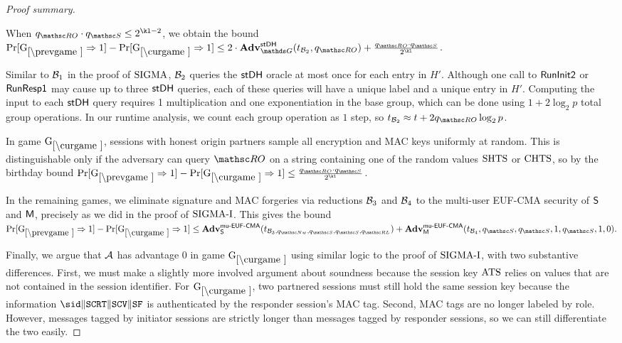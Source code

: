 \begin{proof}[Proof summary]
\begin{enumerate}
\end{enumerate}
When $\qRO \cdot \qSend \leq 2^{\kl - 2}$, we obtain the bound
$\Pr[\prevGm*\Rightarrow 1 ] - \Pr[\curGm*\Rightarrow 1] \leq 2 \cdot \Adv^{\strongDH}_{\group}(t_{\advB_2},\qRO) +\frac{\qRO \cdot \qSend}{2^{\kl}}$.

Similar to $\mathcal{B}_1$ in the proof of $\mbox{SIGMA}$, $\mathcal{B}_2$ queries the $\mathsf{stDH}$ oracle at most once for each entry in $H'$. Although one call to $\mathsf{RunInit2}$ or $\mathsf{RunResp1}$ may cause up to three $\mathsf{stDH}$ queries, each of these queries will have a unique label and a unique entry in $H'$.
Computing the input to each $\mathsf{stDH}$ query requires 1 multiplication and one exponentiation in the base group, which can be done using $1+2\log_2 p$ total group operations. In our runtime analysis, we count each group operation as $1$ step, so $t_{\advB_2} \approx t + 2 \qRO\log_2 p$.

In game $\curGm$, sessions with honest origin partners sample all encryption and MAC keys uniformly at random. This is distinguishable only if the adversary can query $\RO$ on a string containing one of the random values $\mathrm{SHTS}$ or $\mathrm{CHTS}$, so by the birthday bound
$\Pr[\prevGm*\Rightarrow 1 ] - \Pr[\curGm*\Rightarrow 1] \leq \frac{\qRO\cdot \qSend}{2^{\kl}}$.

In the remaining games, we eliminate signature and MAC forgeries via reductions $\mathcal{B}_3$ and $\mathcal{B}_4$ to the multi-user EUF-CMA security of $\mathsf{S}$ and $\mathsf{M}$, precisely as we did in the proof of $\mbox{SIGMA-I}$. This gives the bound 
$
	\Pr[\prevGm*\Rightarrow 1 ] - \Pr[\curGm*\Rightarrow 1] \leq
		\Adv^{\muEUFCMA}_{\SIGScheme}(t_{\advB_3\cab \qNew\cab \qSend\cab \qSend\cab \qRevLongTermKey})
		+ \Adv^{\muEUFCMA}_{\MACScheme}(t_{\advB_4}\cab \qSend\cab \qSend\cab 1\cab \qSend\cab 1\cab 0).
$

Finally, we argue that $\mathcal{A}$ has advantage $0$ in game $\curGm$ using similar logic to the proof of $\mbox{SIGMA-I}$, with two substantive differences. 
First, we must make a slightly more involved argument about soundness because the session key $\mathrm{ATS}$ relies on values that are not contained in the session identifier. 
For $\curGm$, two partnered sessions must still hold the same session key because the information $\sid\conc\sSCERT\conc\sSCERTV\conc\sSFIN$ is authenticated by the responder session's MAC tag. 
Second, MAC tags are no longer labeled by role. However, messages tagged by initiator sessions are strictly longer than messages tagged by responder sessions, so we can still differentiate the two easily. 
\end{proof}

\fi
\fi
